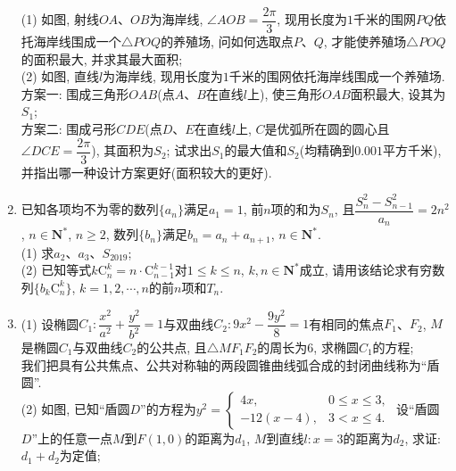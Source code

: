 \documentclass[10pt,a4paper]{article}
\begin{document}
\begin{enumerate}[1.]
\begin{center}
\end{center}
(1) 如图, 射线$OA$、$OB$为海岸线, $\angle AOB=\dfrac{2\pi}3$, 现用长度为$1$千米的围网$PQ$依托海岸线围成一个$\triangle POQ$的养殖场, 问如何选取点$P$、$Q$, 才能使养殖场$\triangle POQ$的面积最大, 并求其最大面积;\\
(2) 如图, 直线$l$为海岸线, 现用长度为$1$千米的围网依托海岸线围成一个养殖场.\\
方案一: 围成三角形$OAB$(点$A$、$B$在直线$l$上), 使三角形$OAB$面积最大, 设其为$S_1$;\\
方案二: 围成弓形$CDE$(点$D$、$E$在直线$l$上, $C$是优弧所在圆的圆心且$\angle DCE=\dfrac{2\pi }3$), 其面积为$S_2$;
试求出$S_1$的最大值和$S_2$(均精确到$0.001$平方千米), 并指出哪一种设计方案更好(面积较大的更好).
\item 已知各项均不为零的数列$\{a_n\}$满足$a_1=1$, 前$n$项的和为$S_n$, 且$\dfrac{S_n^2-S_{n-1}^2}{a_n}=2n^2$,
$n\in \mathbf{N}^*$, $n\ge 2$, 数列$\{b_n\}$满足$b_n=a_n+a_{n+1}$, $n\in \mathbf{N}^*$.\\
(1) 求$a_2$、$a_3$、$S_{2019}$;\\
(2) 已知等式$k\mathrm{C}_n^k=n\cdot \mathrm{C}_{n-1}^{k-1}$对$1\le k\le n$, $k,n\in \mathbf{N}^*$成立, 请用该结论求有穷数列$\{b_k\mathrm{C}_n^k\}$, $k=1,2,\cdots,n$的前$n$项和$T_n$.
\item (1) 设椭圆$C_1:\dfrac{x^2}{a^2}+\dfrac{y^2}{b^2}=1$与双曲线$C_2:9{x^2}-\dfrac{9y^2}8=1$有相同的焦点$F_1$、$F_2$, $M$是椭圆$C_1$与双曲线$C_2$的公共点, 且$\triangle MF_1F_2$的周长为$6$, 求椭圆$C_1$的方程;\\
我们把具有公共焦点、公共对称轴的两段圆锥曲线弧合成的封闭曲线称为``盾圆''.\\
(2) 如图, 已知``盾圆$D$''的方程为$y^2=\begin{cases}
4x, &  0\le x\le 3,\\ -12(x-4), & 3<x\le 4.  \end{cases}$ 设``盾圆$D$''上的任意一点$M$到$F(1,0)$的距离为$d_1$, $M$到直线$l:x=3$的距离为$d_2$, 求证: $d_1+d_2$为定值;\\

\end{enumerate}
\end{document}
